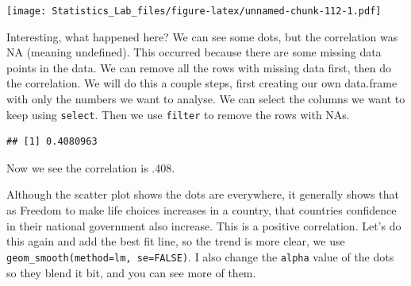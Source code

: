 \documentclass[
]{book}
\newenvironment{Shaded}{\begin{snugshade}}{\end{snugshade}}
\newcommand{\AttributeTok}[1]{\textcolor[rgb]{0.77,0.63,0.00}{#1}}
\newcommand{\FunctionTok}[1]{\textcolor[rgb]{0.00,0.00,0.00}{#1}}
\newcommand{\NormalTok}[1]{#1}
\newcommand{\OtherTok}[1]{\textcolor[rgb]{0.56,0.35,0.01}{#1}}
\newcommand{\SpecialCharTok}[1]{\textcolor[rgb]{0.00,0.00,0.00}{#1}}
\newcommand{\StringTok}[1]{\textcolor[rgb]{0.31,0.60,0.02}{#1}}
\begin{document}
\texttt{[image: Statistics\_Lab\_files/figure-latex/unnamed-chunk-112-1.pdf]}

Interesting, what happened here? We can see some dots, but the correlation was NA (meaning undefined). This occurred because there are some missing data points in the data. We can remove all the rows with missing data first, then do the correlation. We will do this a couple steps, first creating our own data.frame with only the numbers we want to analyse. We can select the columns we want to keep using \texttt{select}. Then we use \texttt{filter} to remove the rows with NAs.

\begin{Shaded}
\end{Shaded}

\begin{verbatim}
## [1] 0.4080963
\end{verbatim}

Now we see the correlation is .408.

Although the scatter plot shows the dots are everywhere, it generally shows that as Freedom to make life choices increases in a country, that countries confidence in their national government also increase. This is a positive correlation. Let's do this again and add the best fit line, so the trend is more clear, we use \texttt{geom\_smooth(method=lm,\ se=FALSE)}. I also change the \texttt{alpha} value of the dots so they blend it bit, and you can see more of them.
\end{document}
